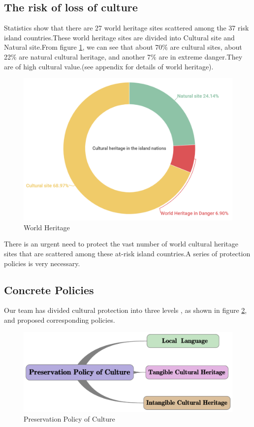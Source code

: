 \documentclass[12pt]{article}  %
\begin{document}
\subsection{The risk of loss of culture}
Statistics show that there are 27 world heritage sites scattered among the 37 risk island countries.These world heritage sites are divided into Cultural site and Natural site.From figure \ref{culture site}, we can see that about 70\% are cultural sites, about 22\% are natural cultural heritage, and another 7\% are in extreme danger.They are of high cultural value.(see appendix for details of world heritage).

\begin{figure}[htbp]
	\centering
	\includegraphics[width=.8\textwidth]{culture site.png}
	\caption{ World Heritage}\label{culture site}
\end{figure}

There is an urgent need to protect the vast number of world cultural heritage sites that are scattered among these at-risk island countries.A series of protection policies is very necessary.



\subsection{Concrete Policies}
Our team has divided cultural protection into three levels , as shown in figure \ref{culture 3 levels}, and proposed corresponding policies.

\begin{figure}[htbp]
	\centering
	\includegraphics[width=.8\textwidth]{culture 3 levels.png}
	\caption{ Preservation Policy of Culture}\label{culture 3 levels}
\end{figure}
\end{document}
